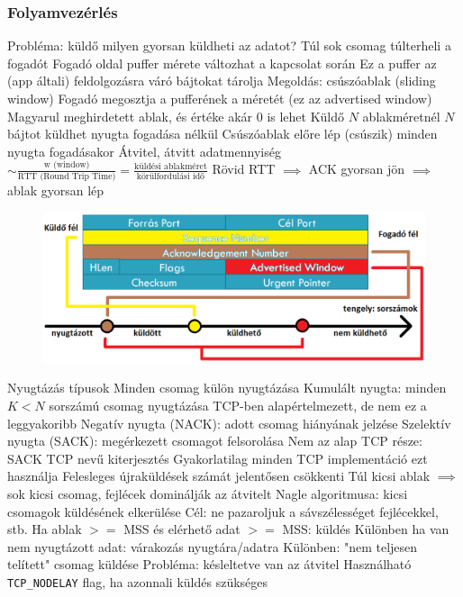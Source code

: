 \documentclass[12pt,a4paper]{article}
\begin{document}
\subsubsection{Folyamvezérlés}

\begin{outline}
	\1 Probléma: küldő milyen gyorsan küldheti az adatot?
		\2 Túl sok csomag túlterheli a fogadót
		\2 Fogadó oldal puffer mérete változhat a kapcsolat során
			\3 Ez a puffer az (app általi) feldolgozásra váró bájtokat tárolja
	\1 Megoldás: csúszóablak (sliding window)
		\2 Fogadó megosztja a pufferének a méretét (ez az advertised window)
			\3 Magyarul meghirdetett ablak, és értéke akár 0 is lehet
		\2 Küldő $N$ ablakméretnél $N$ bájtot küldhet nyugta fogadása nélkül
		\2 Csúszóablak előre lép (csúszik) minden nyugta fogadásakor
		\2 Átvitel, átvitt adatmennyiség $\sim \frac{\text{w (window)}}{\text{RTT (Round Trip Time)}} = \frac{\text{küldési ablakméret}}{\text{körülfordulási idő}}$
			\3 Rövid RTT $\implies$ ACK gyorsan jön $\implies$ ablak gyorsan lép
\end{outline}

\begin{figure}[h!]
	\centering
	\includegraphics[width=0.65\linewidth]{"csúszóablak"}
\end{figure}

\pagebreak

\begin{outline}
	\1 Nyugtázás típusok
		\2 Minden csomag külön nyugtázása
		\2 Kumulált nyugta: minden $K<N$ sorszámú csomag nyugtázása
			\3 TCP-ben alapértelmezett, de nem ez a leggyakoribb
		\2 Negatív nyugta (NACK): adott csomag hiányának jelzése
		\2 Szelektív nyugta (SACK): megérkezett csomagot felsorolása
			\3 Nem az alap TCP része: SACK TCP nevű kiterjesztés
			\3 Gyakorlatilag minden TCP implementáció ezt használja
			\3 Felesleges újraküldések számát jelentősen csökkenti
	\1 Túl kicsi ablak $\implies$ sok kicsi csomag, fejlécek dominálják az átvitelt
	\1 Nagle algoritmusa: kicsi csomagok küldésének elkerülése
		\2 Cél: ne pazaroljuk a sávszélességet fejlécekkel, stb.
		\2 Ha ablak $>=$ MSS és elérhető adat $>=$ MSS: küldés
		\2 Különben ha van nem nyugtázott adat: várakozás nyugtára/adatra
		\2 Különben: "nem teljesen telített" csomag küldése
		\2 Probléma: késleltetve van az átvitel
			\3 Használható \texttt{TCP\_NODELAY} flag, ha azonnali küldés szükséges
\end{outline}
\end{document}
